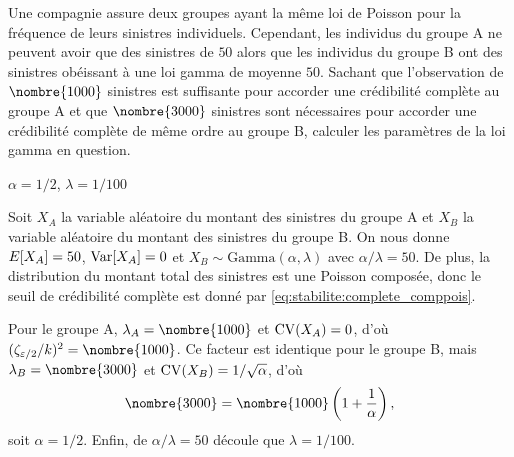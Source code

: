 \begin{exercice}
  Une compagnie assure deux groupes ayant la même loi de Poisson pour
  la fréquence de leurs sinistres individuels. Cependant, les
  individus du groupe A ne peuvent avoir que des sinistres de $50$
  alors que les individus du groupe B ont des sinistres obéissant à
  une loi gamma de moyenne $50$. Sachant que l'observation de
  $\nombre{1000}$ sinistres est suffisante pour accorder une crédibilité
  complète au groupe A et que $\nombre{3000}$ sinistres sont nécessaires
  pour accorder une crédibilité complète de même ordre au groupe B,
  calculer les paramètres de la loi gamma en question.
  \begin{rep}
    $\alpha = 1/2$, $\lambda = 1/100$
  \end{rep}
  \begin{sol}
    Soit $X_A$ la variable aléatoire du montant des sinistres du
    groupe A et $X_B$ la variable aléatoire du montant des sinistres
    du groupe B. On nous donne $E [ X_A ] = 50$, $\operatorname{Var} [ X_A ] = 0$ et
    $X_B \sim \text{Gamma}(\alpha, \lambda)$ avec
    $\alpha/\lambda = 50$. De plus, la distribution du montant total
    des sinistres est une Poisson composée, donc le seuil de
    crédibilité complète est donné par \eqref{eq:stabilite:complete_comppois}.

    Pour le groupe A, $\lambda_A = \nombre{1000}$ et $\operatorname{CV}(X_A) = 0$,
    d'où $(\zeta_{\varepsilon/2}/k)^2 = \nombre{1000}$. Ce facteur est
    identique pour le groupe B, mais $\lambda_B = \nombre{3000}$ et
    $\operatorname{CV}(X_B) = 1/\sqrt{\alpha}$, d'où
    \begin{equation*}
      \nombre{3000} = \nombre{1000}
      \left(
        1 + \frac{1}{\alpha}
      \right),
    \end{equation*}
    soit $\alpha = 1/2$. Enfin, de $\alpha/\lambda = 50$ découle que
    $\lambda = 1/100$.
  \end{sol}
\end{exercice}

